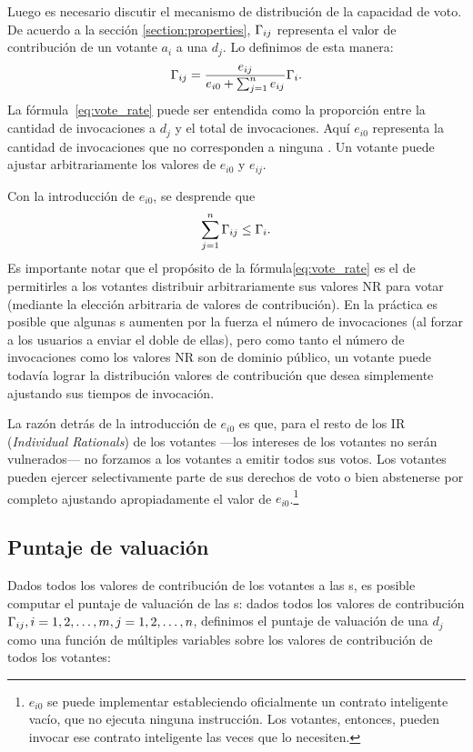 Luego es necesario discutir el mecanismo de distribución de la capacidad de voto. De acuerdo a la sección \ref{section:properties}, $\Gamma_{ij}$ representa el valor de contribución de un votante $a_i$ a una \dapp $d_j$. Lo definimos de esta manera:
\begin{align}
	\label{eq:vote_rate}
	\Gamma_{ij} = \frac{e_{ij}}{e_{i0}+\sum_{j=1}^n {e_{ij}}} \Gamma_i.
\end{align}
La fórmula~\ref{eq:vote_rate} puede ser entendida como la proporción entre la cantidad de invocaciones a $d_j$ y el total de invocaciones. Aquí $e_{i0}$ representa la cantidad de invocaciones que no corresponden a ninguna \dapp. Un votante puede ajustar arbitrariamente los valores de $e_{i0}$ y $e_{ij}$.

Con la introducción de $e_{i0}$, se desprende que
$$\sum_{j=1}^n \Gamma_{ij} \leq \Gamma_i.$$
Es importante notar que el propósito de la fórmula\ref{eq:vote_rate} es el de permitirles a los votantes
distribuir arbitrariamente sus valores NR para votar (mediante la elección arbitraria de valores de contribución). En la práctica es posible que algunas {\dapp}s aumenten por la fuerza el número de invocaciones (al forzar a los usuarios a enviar el doble de ellas), pero como tanto el número de invocaciones como los valores NR son de dominio público, un votante puede todavía lograr la distribución valores de contribución que desea simplemente ajustando sus tiempos de invocación.

La razón detrás de la introducción de $e_{i0}$ es que, para el resto de los IR (\textit{Individual Rationals}) de los votantes —los intereses de los votantes no serán vulnerados— no forzamos a los votantes a emitir todos sus votos. Los votantes pueden ejercer selectivamente parte de sus derechos de voto o bien abstenerse por completo ajustando apropiadamente el valor de $e_{i0}$.\footnote{$e_{i0}$ se puede implementar estableciendo oficialmente un contrato inteligente vacío, que no ejecuta ninguna instrucción. Los votantes, entonces, pueden invocar ese contrato inteligente las veces que lo necesiten.}
\subsection{Puntaje de valuación}
\noindent Dados todos los valores de contribución de los votantes a las {\dapp}s, es posible computar el puntaje de valuación de las {\dapp}s: dados todos los valores de contribución
$\Gamma_{ij},i=1,2,\ldots,m,j=1,2,\ldots,n$, definimos el puntaje de valuación de una \dapp $d_j$ como una función de múltiples variables sobre los valores de contribución de todos los votantes:

